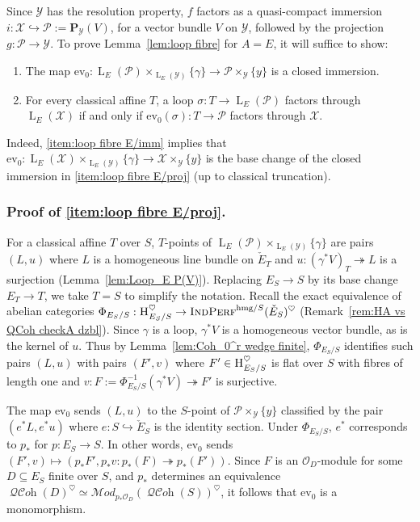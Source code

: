 \documentclass[12pt, oneside]{amsart}
\numberwithin{equation}{section}
\theoremstyle{remark}
\theoremstyle{plain}
\newcommand{\MOD}{\mathcal{M}\textit{od}}
\DeclareMathOperator{\QCOH}{\mathcal{QC}\textit{oh}}
\DeclareMathOperator{\IndPerf}{\textsc{IndPerf}}
\newcommand{\Hcat}{\textup{\textsc{H}}}
\newcommand{\Loop}{\operatorname{L}}
\newcommand{\OO}{\mathcal{O}}
\newcommand{\YY}{\mathcal{Y}}
\newcommand{\XX}{\mathcal{X}}
\newcommand{\ev}{\mathrm{ev}}
\begin{document}
Since $\YY$ has the resolution property, $f$ factors as a quasi-compact immersion $i : \XX \hookrightarrow \mathcal{P} := \mathbf{P}_{\YY}(V)$, for a vector bundle $V$ on $\YY$, followed by the projection $g : \mathcal{P} \to \YY$.
To prove Lemma~\ref{lem:loop fibre} for $A=E$, it will suffice to show:
\begin{enumerate}[label=(\alph*)]
\item\label{item:loop fibre E/proj} The map $\ev_0 : \Loop_E(\mathcal{P}) \times_{\Loop_E(\YY)} \{\gamma\} \to \mathcal{P} \times_{\YY} \{y\}$ is a closed immersion.
\item\label{item:loop fibre E/imm} For every classical affine $T$, a loop $\sigma : T \to \Loop_E(\mathcal{P})$ factors through $\Loop_E(\XX)$ if and only if $\ev_0(\sigma) : T \to \mathcal{P}$ factors through $\XX$.
\end{enumerate}
Indeed, \ref{item:loop fibre E/imm} implies that $\ev_0 : \Loop_E(\XX) \times_{\Loop_E(\YY)} \{\gamma\} \to \XX \times_{\YY} \{y\}$ is the base change of the closed immersion in \ref{item:loop fibre E/proj} (up to classical truncation).

\subsubsection*{Proof of \ref{item:loop fibre E/proj}.}

For a classical affine $T$ over $S$, $T$-points of $\Loop_E(\mathcal{P}) \times_{\Loop_E(\YY)} \{\gamma\}$ are pairs $(L,u)$ where $L$ is a homogeneous line bundle on $\check{E}_T$ and $u : (\gamma^*V)_T \twoheadrightarrow L$ is a surjection (Lemma~\ref{lem:Loop_E P(V)}).
Replacing $E_S \to S$ by its base change $E_T \to T$, we take $T=S$ to simplify the notation.
Recall the exact equivalence of abelian categories $\Phi_{E_S/S} : \Hcat_{E_S/S}^{\heartsuit} \to \IndPerf^{\mathrm{hmg}/S}(\check{E}_S)^\heartsuit$ (Remark~\ref{rem:HA vs QCoh checkA dzbl}).
Since $\gamma$ is a loop, $\gamma^*V$ is a homogeneous vector bundle, as is the kernel of $u$.
Thus by Lemma~\ref{lem:Coh_0^r wedge finite}, $\Phi_{E_S/S}$ identifies such pairs $(L,u)$ with pairs $(F', v)$ where $F' \in \Hcat_{E_S/S}^\heartsuit$ is flat over $S$ with fibres of length one and $v : F := \Phi_{E_S/S}^{-1}(\gamma^*V) \twoheadrightarrow F'$ is surjective.

The map $\ev_0$ sends $(L,u)$ to the $S$-point of $\mathcal{P} \times_{\YY} \{y\}$ classified by the pair $(e^*L, e^*u)$ where $e : S \hookrightarrow \check{E}_S$ is the identity section.
Under $\Phi_{E_S/S}$, $e^*$ corresponds to $p_*$ for $p : E_S \to S$.
In other words, $\ev_0$ sends $(F', v) \mapsto (p_*F', p_*v : p_*(F) \twoheadrightarrow p_*(F'))$.
Since $F$ is an $\OO_D$-module for some $D \subseteq E_S$ finite over $S$, and $p_*$ determines an equivalence $\QCOH(D)^\heartsuit \simeq \MOD_{p_*\OO_{D}}(\QCOH(S))^\heartsuit$, it follows that $\ev_0$ is a monomorphism.
\end{document}

